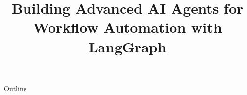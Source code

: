 \documentclass[xcolor=dvipsnames,compress,t,pdf,9pt]{beamer}
\title[\insertframenumber /\inserttotalframenumber]{Building Advanced AI Agents for Workflow Automation with LangGraph}
\begin{document}
	\begin{frame}
	\titlepage
	\end{frame}
	
	\begin{frame}{Outline}
	    \tableofcontents
	\end{frame}

         
	
	
\end{document}
